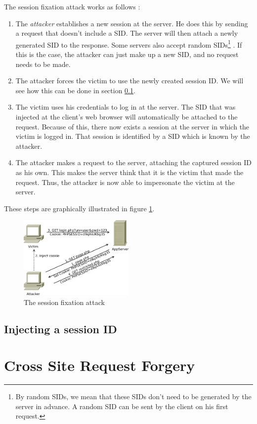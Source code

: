 The session fixation attack works as follows \cite{Kolsek2002}:

\begin{enumerate}
	\item The \emph{attacker} establishes a new session at the server. He does this by sending a request that doesn't include a SID. The server will then attach a newly generated
SID to the response. Some servers also accept random SIDs\footnote{By random SIDs, we mean that these SIDs don't need to be generated by the server in advance. A random SID can be sent by the client on his first request.} \cite{Shiflett2004}. If this is the case, the attacker can just make up a new SID, and no request needs to be made.
	\item The attacker forces the victim to use the newly created session ID. We will see how this can be done in section \ref{injecting-sid}.
	\item The victim uses his credentials to log in at the server. The SID that was injected at the client's web browser will automatically be attached to the request. Because of this, there now exists a session at the server in which the victim is logged in. That session is identified by a SID which is known by the attacker.
	\item The attacker makes a request to the server, attaching the captured session ID as his own. This makes the server think that it is the victim that made the request. Thus, the attacker is now able to impersonate the victim at the server.
\end{enumerate}

These steps are graphically illustrated in figure \ref{fig:fixation}.

\begin{figure}[ht]
	\centering
	\includegraphics[width=0.50\textwidth]{img/fixation.png}
	\caption{The session fixation attack}
	\label{fig:fixation}
\end{figure}

\subsection{Injecting a session ID}\label{injecting-sid}

\section{Cross Site Request Forgery}\label{csrf}
